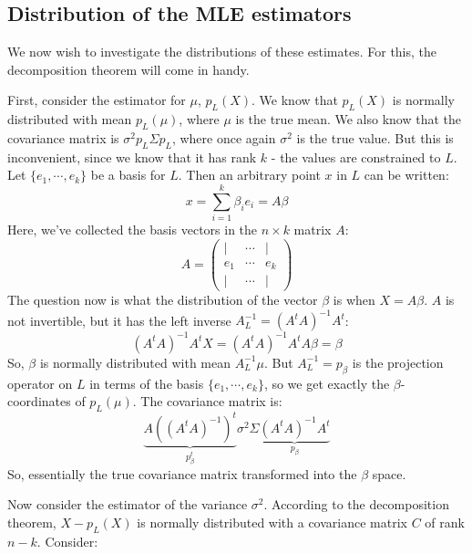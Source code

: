 \documentclass[12pt, a4paper]{article}
\numberwithin{equation}{section}
\begin{document}
\subsection{Distribution of the MLE estimators}
We now wish to investigate the distributions of these estimates. For this, the decomposition theorem will come in handy.

First, consider the estimator for $\mu$, $p_L(X)$. We know that $p_L(X)$ is normally distributed with mean $p_L(\mu)$, where $\mu$ is the true mean. We also know that the covariance matrix is $\sigma^2 p_L\Sigma p_L$, where once again $\sigma^2$ is the true value. But this is inconvenient, since we know that it has rank $k$ - the values are constrained to $L$. Let $\{e_1,\cdots,e_k\}$ be a basis for $L$. Then an arbitrary point $x$ in $L$ can be written:
\begin{equation}
x=\sum_{i=1}^k\beta_i e_i=A\beta
\end{equation}
Here, we've collected the basis vectors in the $n\times k$ matrix $A$:
\begin{equation}
A=
\begin{pmatrix}
| & \cdots & | \\
e_1 & \cdots & e_k \\
| & \cdots & |
\end{pmatrix}
\end{equation}
The question now is what the distribution of the vector $\beta$ is when $X=A\beta$. $A$ is not invertible, but it has the left inverse $A_L^{-1}=(A^t A)^{-1}A^t$:
\begin{equation}
(A^t A)^{-1}A^t X=(A^t A)^{-1}A^t A\beta=\beta
\end{equation}
So, $\beta$ is normally distributed with mean $A_L^{-1}\mu$. But $A_L^{-1}=p_\beta$ is the projection operator on $L$ in terms of the basis $\{e_1,\cdots,e_k\}$, so we get exactly the $\beta$-coordinates of $p_L(\mu)$. The covariance matrix is:
\begin{equation}
\underbrace{A((A^t A)^{-1})^t}_{p_\beta^t}\sigma^2\Sigma\underbrace{(A^t A)^{-1}A^t}_{p_\beta}
\end{equation}
So, essentially the true covariance matrix transformed into the $\beta$ space.

Now consider the estimator of the variance $\sigma^2$. According to the decomposition theorem, $X-p_L(X)$ is normally distributed with a covariance matrix $C$ of rank $n-k$. Consider:
\begin{equation}

\end{equation}
\end{document}
